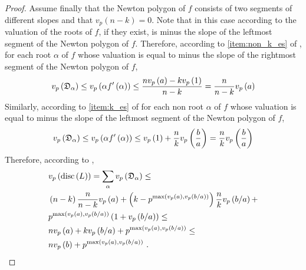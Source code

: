 \documentclass[../main.tex]{subfiles}
\begin{document}
\begin{proof}
    Assume finally that the Newton polygon of $f$ consists of two segments of different slopes and that $v_p\left( n - k \right) = 0$.
    Note that in this case according to  the valuation of the \ex roots of $f$, if they exist, is minus the slope of the leftmost segment of the Newton polygon of $f$. 
    Therefore, according to \cref{item:non_k_es} of , for each root $\alpha$ of $f$ whose valuation is equal to minus the slope of the rightmost segment of the Newton polygon of $f$,
    \[
      v_p\left( \mathfrak{D}_\alpha \right) 
      \leq
      v_p\left( \alpha f'\left( \alpha \right) \right)
      \leq
      \frac{
        n v_p\left( a \right) - kv_p\left( 1 \right)
      }{
        n - k
      }
      =
      \frac{n}{n - k}v_p\left( a \right)
    \]
    Similarly, according to \cref{item:k_es} of  for each non \ex root $\alpha$ of $f$ whose valuation is equal to minus the slope of the leftmost segment of the Newton polygon of $f$,
    \[
      v_p\left( \mathfrak{D}_\alpha \right) 
      \leq
      v_p\left( \alpha f'\left( \alpha \right) \right)
      \leq
      v_p\left( 1 \right) + \frac{n}{k} v_p\left( \frac{b}{a } \right)
      =
      \frac{n}{k} v_p\left( \frac{b}{a } \right)
    \]
    Therefore, according to ,    
    \begin{align*}
      &
      v_p\left( \operatorname{disc}\left( L \right) \right)
      =
      \sum_{\alpha} v_p\left( \mathfrak{D}_\alpha \right)
      \leq
      \\
      &
      \left( n - k \right)\frac{n}{ n - k } v_p\left( a \right)
      +
      \left( k - p^{\max\left( v_p\left( a \right), v_p\left( b / a \right) \right)} \right) \frac{n}{k} v_p\left( b / a \right)
      +
      \\
      &
      p^{\max\left( v_p\left( a \right), v_p\left( b / a \right) \right)} \left( 1 + v_p\left( b / a \right) \right)
      \leq
      \\
      &
      nv_p\left( a \right) + k v_p\left( b / a \right) + p^{\max\left( v_p\left( a \right), v_p\left( b / a \right) \right)}
      \leq
      \\
      &
      nv_p\left( b \right) + p^{\max\left( v_p\left( a \right), v_p\left( b / a \right) \right)}
      \ .
      \qedhere
    \end{align*}
  \end{proof}
\end{document}
